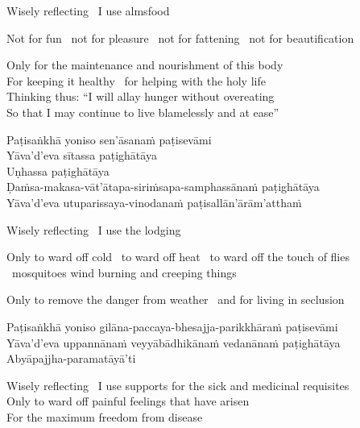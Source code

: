 \begin{english-keepwith}
  Wisely reflecting \breathmark\ I use almsfood
  \begin{english-hangtogether}
    Not for fun \breathmark\ not for pleasure \breathmark\ not for fattening \breathmark\ not for beautification
  \end{english-hangtogether}
  Only for the maintenance and nourishment of this body\\
  For keeping it healthy \breathmark\ for helping with the holy life\\
  Thinking thus: ``I will allay hunger without overeating\\
  So that I may continue to live blamelessly and at ease''
\end{english-keepwith}

Paṭisaṅkhā yoniso sen'āsanaṁ paṭisevāmi\\
Yāva'd'eva sītassa paṭighātāya\\
Uṇhassa paṭighātāya\\
Ḍaṁsa-makasa-vāt'ātapa-siriṁsapa-samphassānaṁ paṭighātāya\\
Yāva'd'eva utuparissaya-vinodanaṁ paṭisallān'ārām'atthaṁ

\begin{english-keepwith}
  Wisely reflecting \breathmark\ I use the lodging
  \begin{english-hangtogether}
    Only to ward off cold \breathmark\ to ward off heat \breathmark\ to ward off the touch of flies \breathmark\ mosquitoes wind burning and creeping things
  \end{english-hangtogether}
  \begin{english-hangtogether}
    Only to remove the danger from weather \breathmark\ and for living in seclusion
  \end{english-hangtogether}
\end{english-keepwith}

Paṭisaṅkhā yoniso gilāna-paccaya-bhesajja-parikkhāraṁ paṭisevāmi\\
Yāva'd'eva uppannānaṁ veyyābādhikānaṁ vedanānaṁ paṭighātāya\\
Abyāpajjha-paramatāyā'ti

\begin{english-verses}
  Wisely reflecting \breathmark\ I use supports for the sick and medicinal requisites\\
  Only to ward off painful feelings that have arisen\\
  For the maximum freedom from disease
\end{english-verses}

